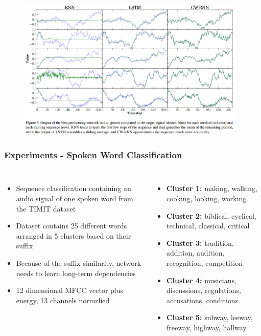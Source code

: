 \documentclass{beamer}
\begin{document}
\frame
{
	\begin{figure}[ht]  
		\begin{center}
			\includegraphics[width=4.3in]{Images/cwrnn_output.png}   
		\end{center}   
	\end{figure}
}
\frame
{
   \frametitle{Experiments - Spoken Word Classification}
   \begin{columns}
		\begin{itemize}		
			\item Sequence classification containing an audio signal of one spoken word from the TIMIT dataset  
			\item Dataset contains 25 different words arranged in 5 clusters based on their suffix 
			\item Because of the suffix-similarity, network needs to learn long-term dependencies
			\item 12 dimensional MFCC vector plus energy, 13 channels normzlied			
		\end{itemize}
		\begin{itemize}
			\item \textbf{Cluster 1:} making, walking, cooking, looking, working
			\item \textbf{Cluster 2:} biblical, cyclical, technical, classical, critical
			\item \textbf{Cluster 3:} tradition, addition, audition, recognition, competition
			\item \textbf{Cluster 4:} musicians, discussions, regulations, accusations, conditions
			\item \textbf{Cluster 5:} subway, leeway, freeway, highway, hallway
		\end{itemize}		
	\end{columns}
}
\frame
\end{document}
